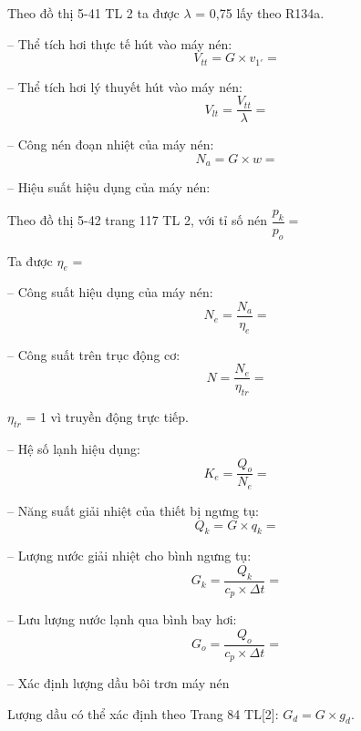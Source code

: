 Theo đồ thị 5-41 TL 2 ta được $\lambda$ = 0,75 lấy theo R134a.


-- Thể tích hơi thực tế hút vào máy nén: 
\begin{equation*}
	V_{tt} = G \times v_{1'} = 
\end{equation*}

-- Thể tích hơi lý thuyết hút vào máy nén:
\begin{equation*}
	V_{lt} = \dfrac{V_{tt}}{\lambda} = 
\end{equation*}

-- Công nén đoạn nhiệt của máy nén:
\begin{equation*}
	N_{a} = G\times w = 
\end{equation*}

-- Hiệu suất hiệu dụng của máy nén:

Theo đồ thị 5-42 trang 117 TL 2, với tỉ số nén $ \dfrac{p_{k}}{p_{o}} =  $

Ta được $\eta_{e}$ = 

-- Công suất hiệu dụng của máy nén:
\begin{equation*}
	N_{e} = \dfrac{N_{a}}{\eta_{e}} = 
\end{equation*}

-- Công suất trên trục động cơ:
\begin{equation*}
	N = \dfrac{N_{e}}{\eta_{tr}} = 
\end{equation*}

$ \eta_{tr} $ = 1 vì truyền động trực tiếp. 

-- Hệ số lạnh hiệu dụng:
\begin{equation*}
	K_{e} = \dfrac{Q_{o}}{N_{e}} = 
\end{equation*}

-- Năng suất giải nhiệt của thiết bị ngưng tụ:
\begin{equation*}
	Q_{k} = G\times q_{k} = 
\end{equation*}

-- Lượng nước giải nhiệt cho bình ngưng tụ:
\begin{equation*}
	G_{k} = \dfrac{Q_{k}}{c_{p}\times \Delta t} = 
\end{equation*}

-- Lưu lượng nước lạnh qua bình bay hơi:
\begin{equation*}
	G_{o} = \dfrac{Q_{o}}{c_{p}\times \Delta t} = 
\end{equation*}

-- Xác định lượng dầu bôi trơn máy nén

Lượng dầu có thể xác định theo Trang 84 TL[2]: $G_{d} = G\times g_{d}$.


